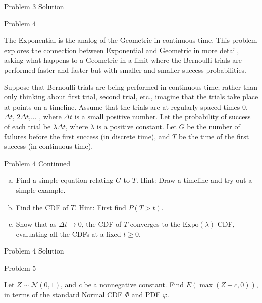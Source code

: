 \documentclass{beamer}
\begin{document}
\begin{frame}{Problem 3 Solution}
	
\end{frame}

\begin{frame}{Problem 4}

The Exponential is the analog of the Geometric in continuous time. This problem explores the connection between Exponential and Geometric in more detail, asking what happens to a Geometric in a limit where the Bernoulli trials are performed faster and faster but with smaller and smaller success probabilities.

Suppose that Bernoulli trials are being performed in continuous time; rather than only thinking about first trial, second trial, etc., imagine that the trials take place at points on a timeline. Assume that the trials are at regularly spaced times $0$, $\Delta t$, $2\Delta t$,... , where $\Delta t$ is a small positive number. Let the probability of success of each trial be $\lambda \Delta t$, where $\lambda$ is a positive constant. Let $G$ be the number of failures before the first success (in discrete time), and $T$ be the time of the first success (in continuous time).
	
\end{frame}

\begin{frame}{Problem 4 Continued}

\begin{enumerate}[(a)]
	\item Find a simple equation relating $G$ to $T$. Hint: Draw a timeline and try out a simple example.
	\item Find the CDF of $T$. Hint: First find $P(T>t)$.
	\item Show that as $\Delta t\to 0$, the CDF of $T$ converges to the $\text{Expo}(\lambda )$ CDF, evaluating all the CDFs at a fixed $t\geq 0$.
\end{enumerate}
	
\end{frame}

\begin{frame}{Problem 4 Solution}
	
\end{frame}

\begin{frame}{Problem 5}

Let $Z \sim \mathcal{N}(0,1)$, and $c$ be a nonnegative constant. Find $E(\max (Z-c, 0))$, in terms of the standard Normal CDF $\Phi$ and PDF $\varphi$.
	
\end{frame}
\end{document}
